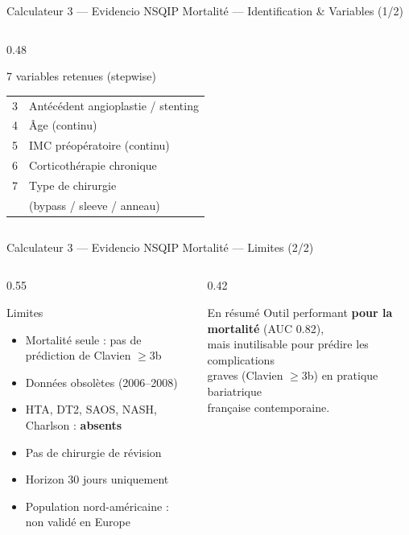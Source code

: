 \documentclass[aspectratio=169]{beamer}
\newcommand{\tightlist}{%
  \setlength{\itemsep}{1pt}\setlength{\parskip}{0pt}%
  \setlength{\parsep}{0pt}\setlength{\topsep}{2pt}}
\begin{document}
\begin{frame}{Calculateur 3 --- Evidencio NSQIP Mortalité --- Identification \& Variables (1/2)}
\begin{columns}[T]
\begin{column}{0.48\textwidth}
\begin{block}{7 variables retenues (stepwise)}
\begin{tabular}{cl}
          3 & Antécédent angioplastie / stenting \\
          4 & Âge (continu) \\
          5 & IMC préopératoire (continu) \\
          6 & Corticothérapie chronique \\
          7 & Type de chirurgie \\
            & (bypass / sleeve / anneau) \\
          \bottomrule
        \end{tabular}
      \end{block}
    \end{column}
  \end{columns}
\end{frame}

\begin{frame}{Calculateur 3 --- Evidencio NSQIP Mortalité --- Limites (2/2)}
  \begin{columns}[T]
    \begin{column}{0.55\textwidth}
      \begin{alertblock}{Limites}
        \footnotesize\tightlist
        \begin{itemize}\tightlist
          \item Mortalité seule : pas de prédiction de Clavien $\geq$3b
          \item Données obsolètes (2006--2008)
          \item HTA, DT2, SAOS, NASH, Charlson : \textbf{absents}
          \item Pas de chirurgie de révision
          \item Horizon 30 jours uniquement
          \item Population nord-américaine : non validé en Europe
        \end{itemize}
      \end{alertblock}
    \end{column}
    \begin{column}{0.42\textwidth}
      \begin{block}{En résumé}
        \footnotesize
        Outil performant \textbf{pour la mortalité} (AUC 0.82),\\
        mais inutilisable pour prédire les complications\\
        graves (Clavien $\geq$3b) en pratique bariatrique\\
        française contemporaine.
      \end{block}
    \end{column}
  \end{columns}
\end{frame}
\end{document}
